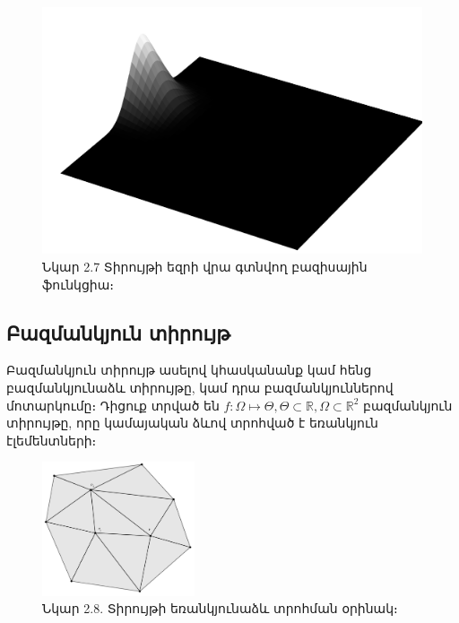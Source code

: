 \documentclass[fleqn, bachelor,subf,12pt,notitlepage]{article}
\begin{document}
\begin{figure}[h!]
\centering
\includegraphics[width=1.0\textwidth]{images/two_dimensional_basis_1}
\captionsetup{labelformat=empty}
\caption{Նկար 2.7 Տիրույթի եզրի վրա գտնվող բազիսային ֆունկցիա։}
\end{figure}
\newpage
\subsection*{Բազմանկյուն տիրույթ}
Բազմանկյուն տիրույթ ասելով կհասկանանք կամ հենց բազմանկյունաձև տիրույթը, կամ դրա բազմանկյուններով մոտարկումը։
Դիցուք տրված են $f:\Omega\mapsto \Theta, \Theta \subset \mathbb{R}, \Omega \subset \mathbb{R}^{2} $ բազմանկյուն տիրույթը, որը կամայական ձևով տրոհված է եռանկյուն էլեմենտների։
\begin{figure}[H]
\centering
\includegraphics[width=0.4\textwidth]{images/two_var_triangular}
\captionsetup{labelformat=empty}
\caption{Նկար 2.8. Տիրույթի եռանկյունաձև տրոհման օրինակ։}
\end{figure}
\end{document}
